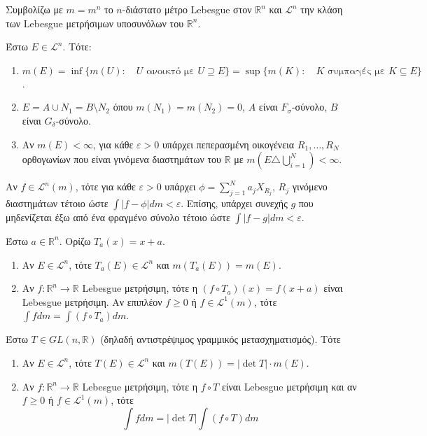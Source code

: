 $ $\newline Συμβολίζω με $m = m^n$ το $n$-διάστατο μέτρο {\eng Lebesgue} στον $\mathbb R^n$ και $\mathcal L^n$ την κλάση των {\eng Lebesgue} μετρήσιμων υποσυνόλων του $\mathbb R^n$.

\begin{theorem}
    Έστω $E \in \mathcal L^n$. Τότε:
    \begin{enumerate}
        \item $m(E) = \inf \{ m(U):\quad U \text{ ανοικτό με } U \supseteq E \} = \sup \{ m(K): \quad K \text{ συμπαγές με } K\subseteq E\}$.
        \item $ E = A\cup N_1 = B \setminus N_2$ όπου $m(N_1) = m(N_2) = 0$, $A$ είναι $F_{\sigma}$-σύνολο, $B$ είναι $G_{\delta}$-σύνολο.
        \item Αν $m(E) < \infty$, για κάθε $\varepsilon >0$ υπάρχει πεπερασμένη οικογένεια ${R_1,\ldots, R_N}$ ορθογωνίων που είναι γινόμενα διαστημάτων του $\mathbb{R}$ με $m(E \triangle \bigcup\limits_{i=1}^N) <\infty$.
        
    \end{enumerate}
\end{theorem}

\begin{theorem}
    Αν  $f\in \mathcal{L}^n(m)$, τότε για κάθε $\varepsilon >0$ υπάρχει $\phi = \sum\limits_{j=1}^N a_j X_{R_j}$, $R_j$ γινόμενο διαστημάτων τέτοιο ώστε $\int |f-\phi|dm < \varepsilon$. Επίσης, υπάρχει συνεχής $g$ που μηδενίζεται έξω από ένα φραγμένο σύνολο τέτοιο ώστε $\int |f-g|dm <\varepsilon$.

\end{theorem}

\begin{theorem} Έστω $a \in \mathbb{R}^n$. Ορίζω $T_a (x) = x+a$.
    \begin{enumerate}
        \item Αν $E \in \mathcal{L}^n$, τότε $T_a (E) \in \mathcal{L}^n$ και $m(T_a(E)) = m(E)$.
        \item Αν $f : \mathbb R^n \rightarrow \mathbb{R}$ {\eng Lebesgue} μετρήσιμη, τότε η $(f \circ T_a)(x) = f(x+a)$ είναι {\eng Lebesgue} μετρήσιμη. Αν επιπλέον $f \geq 0$ ή $f \in \mathcal L^1(m)$, τότε $\int f dm = \int (f\circ T_a) dm$.
        
    \end{enumerate}
\end{theorem}

\begin{theorem}
    Έστω $T \in GL(n,\mathbb{R})$ (δηλαδή αντιστρέψιμος γραμμικός μετασχηματισμός). Τότε
    \begin{enumerate}
        \item Αν $E \in \mathcal{L}^n$, τότε $T(E) \in \mathcal L^n$ και $m(T(E)) = |\det T| \cdot m(E)$.
        \item Αν $f: \mathbb{R}^n \rightarrow \mathbb{R}$ {\eng Lebesgue} μετρήσιμη, τότε η $f\circ T$ είναι {\eng Lebesgue} μετρήσιμη και αν $f\geq 0$ ή $f \in \mathcal L^1 (m)$, τότε 
        $$\int f dm = |\det T| \int (f\circ T) dm$$
    \end{enumerate}
\end{theorem}


